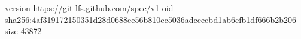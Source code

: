 version https://git-lfs.github.com/spec/v1
oid sha256:4af319172150351d28d0688ee56b810cc5036adccecbd1ab6efb1df666b2b206
size 43872
